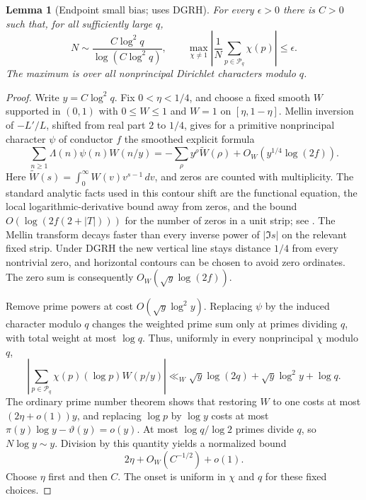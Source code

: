 \documentclass[11pt]{article}
\newtheorem{lemma}[theorem]{Lemma}
\theoremstyle{remark}\newtheorem{remark}[theorem]{Remark}
\newcommand{\abs}[1]{\left|#1\right|}
\begin{document}
\begin{lemma}[Endpoint small bias; uses DGRH]\label{lem:bias}
For every $\epsilon>0$ there is $C>0$ such that, for all sufficiently large $q$,
\[
 N\sim\frac{C\log^2q}{\log(C\log^2q)},\qquad
 \max_{\chi\ne1}\abs{\frac1N\sum_{p\in\mathcal P_q}\chi(p)}\le\epsilon.
\]
The maximum is over all nonprincipal Dirichlet characters modulo $q$.
\end{lemma}
\begin{proof}
Write $y=C\log^2q$. Fix $0<\eta<1/4$, and choose a fixed smooth $W$ supported in $(0,1)$ with $0\le W\le1$ and $W=1$ on $[\eta,1-\eta]$. Mellin inversion of $-L'/L$, shifted from real part $2$ to $1/4$, gives for a primitive nonprincipal character $\psi$ of conductor $f$ the smoothed explicit formula
\[
 \sum_{n\ge1}\Lambda(n)\psi(n)W(n/y)
 =-\sum_\rho y^\rho\widetilde W(\rho)
       +O_W(y^{1/4}\log(2f)).
\]
Here $\widetilde W(s)=\int_0^\infty W(v)v^{s-1}\,dv$, and zeros are counted with multiplicity. The standard analytic facts used in this contour shift are the functional equation, the local logarithmic-derivative bound away from zeros, and the bound $O(\log(2f(2+|T|)))$ for the number of zeros in a unit strip; see \cite[Chs.~10, 12--13]{MV}. The Mellin transform decays faster than every inverse power of $|\Im s|$ on the relevant fixed strip. Under DGRH the new vertical line stays distance $1/4$ from every nontrivial zero, and horizontal contours can be chosen to avoid zero ordinates. The zero sum is consequently $O_W(\sqrt y\log(2f))$.

Remove prime powers at cost $O(\sqrt y\log^2y)$. Replacing $\psi$ by the induced character modulo $q$ changes the weighted prime sum only at primes dividing $q$, with total weight at most $\log q$. Thus, uniformly in every nonprincipal $\chi$ modulo $q$,
\[
 \abs{\sum_{p\in\mathcal P_q}\chi(p)(\log p)W(p/y)}
 \ll_W\sqrt y\log(2q)+\sqrt y\log^2y+\log q.
\]
The ordinary prime number theorem shows that restoring $W$ to one costs at most $(2\eta+o(1))y$, and replacing $\log p$ by $\log y$ costs at most
$\pi(y)\log y-\vartheta(y)=o(y)$. At most $\log q/\log2$ primes divide $q$, so $N\log y\sim y$. Division by this quantity yields a normalized bound
\[
 2\eta+O_W(C^{-1/2})+o(1).
\]
Choose $\eta$ first and then $C$. The onset is uniform in $\chi$ and $q$ for these fixed choices.
\end{proof}
\end{document}

